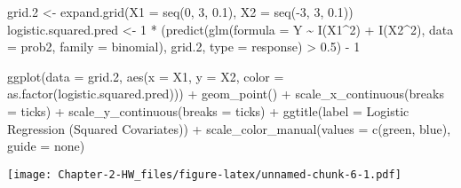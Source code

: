 \documentclass[
]{article}
\newenvironment{Shaded}{\begin{snugshade}}{\end{snugshade}}
\newcommand{\AttributeTok}[1]{\textcolor[rgb]{0.77,0.63,0.00}{#1}}
\newcommand{\DecValTok}[1]{\textcolor[rgb]{0.00,0.00,0.81}{#1}}
\newcommand{\FloatTok}[1]{\textcolor[rgb]{0.00,0.00,0.81}{#1}}
\newcommand{\FunctionTok}[1]{\textcolor[rgb]{0.00,0.00,0.00}{#1}}
\newcommand{\NormalTok}[1]{#1}
\newcommand{\OtherTok}[1]{\textcolor[rgb]{0.56,0.35,0.01}{#1}}
\newcommand{\SpecialCharTok}[1]{\textcolor[rgb]{0.00,0.00,0.00}{#1}}
\newcommand{\StringTok}[1]{\textcolor[rgb]{0.31,0.60,0.02}{#1}}
\begin{document}
\begin{Shaded}
\begin{Highlighting}[]
\NormalTok{grid}\FloatTok{.2} \OtherTok{\textless{}{-}} \FunctionTok{expand.grid}\NormalTok{(}\AttributeTok{X1 =} \FunctionTok{seq}\NormalTok{(}\DecValTok{0}\NormalTok{, }\DecValTok{3}\NormalTok{, }\FloatTok{0.1}\NormalTok{), }\AttributeTok{X2 =} \FunctionTok{seq}\NormalTok{(}\SpecialCharTok{{-}}\DecValTok{3}\NormalTok{, }\DecValTok{3}\NormalTok{, }\FloatTok{0.1}\NormalTok{))}
\NormalTok{logistic.squared.pred }\OtherTok{\textless{}{-}} \DecValTok{1} \SpecialCharTok{*}\NormalTok{ (}\FunctionTok{predict}\NormalTok{(}\FunctionTok{glm}\NormalTok{(}\AttributeTok{formula =}\NormalTok{ Y }\SpecialCharTok{\textasciitilde{}} \FunctionTok{I}\NormalTok{(X1}\SpecialCharTok{\^{}}\DecValTok{2}\NormalTok{) }\SpecialCharTok{+} \FunctionTok{I}\NormalTok{(X2}\SpecialCharTok{\^{}}\DecValTok{2}\NormalTok{), }\AttributeTok{data =}\NormalTok{ prob2, }\AttributeTok{family =}\NormalTok{ binomial), grid}\FloatTok{.2}\NormalTok{, }\AttributeTok{type =} \StringTok{\textquotesingle{}response\textquotesingle{}}\NormalTok{) }\SpecialCharTok{\textgreater{}} \FloatTok{0.5}\NormalTok{) }\SpecialCharTok{{-}} \DecValTok{1}

\FunctionTok{ggplot}\NormalTok{(}\AttributeTok{data =}\NormalTok{ grid}\FloatTok{.2}\NormalTok{, }\FunctionTok{aes}\NormalTok{(}\AttributeTok{x =}\NormalTok{ X1, }\AttributeTok{y =}\NormalTok{ X2, }\AttributeTok{color =} \FunctionTok{as.factor}\NormalTok{(logistic.squared.pred))) }\SpecialCharTok{+}
  \FunctionTok{geom\_point}\NormalTok{() }\SpecialCharTok{+} 
  \FunctionTok{scale\_x\_continuous}\NormalTok{(}\AttributeTok{breaks =}\NormalTok{ ticks) }\SpecialCharTok{+} 
  \FunctionTok{scale\_y\_continuous}\NormalTok{(}\AttributeTok{breaks =}\NormalTok{ ticks) }\SpecialCharTok{+}
  \FunctionTok{ggtitle}\NormalTok{(}\AttributeTok{label =} \StringTok{\textquotesingle{}Logistic Regression (Squared Covariates)\textquotesingle{}}\NormalTok{) }\SpecialCharTok{+} 
  \FunctionTok{scale\_color\_manual}\NormalTok{(}\AttributeTok{values =} \FunctionTok{c}\NormalTok{(}\StringTok{\textquotesingle{}green\textquotesingle{}}\NormalTok{, }\StringTok{\textquotesingle{}blue\textquotesingle{}}\NormalTok{), }\AttributeTok{guide =} \StringTok{\textquotesingle{}none\textquotesingle{}}\NormalTok{)}
\end{Highlighting}
\end{Shaded}

\texttt{[image: Chapter-2-HW\_files/figure-latex/unnamed-chunk-6-1.pdf]}
\end{document}
